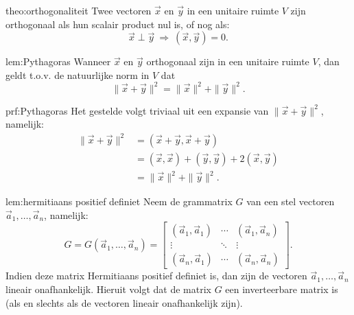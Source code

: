 \begin{theo}[Orthogonaliteit]{theo:orthogonaliteit}
    Twee vectoren $\vec{x}$ en $\vec{y}$ in een unitaire ruimte $V$ zijn orthogonaal als hun scalair product nul is, of nog als:
    \begin{equation*}
        \vec{x} \perp \vec{y} \ \Rightarrow \ (\vec{x},\vec{y}) = 0.
    \end{equation*}
    \vspace{-0.5cm}
\end{theo}

\begin{lem}[Pythagoras]{lem:Pythagoras}
    Wanneer $\vec{x}$ en $\vec{y}$ orthogonaal zijn in een unitaire ruimte $V$, dan geldt t\@.o\@.v\@. de natuurlijke norm in $V$ dat
    \begin{equation*}
        \| \vec{x} + \vec{y} \|^2 = \| \vec{x} \|^2 + \| \vec{y} \|^2.
    \end{equation*}
    \vspace{-0.5cm}
\end{lem}

\begin{prf}[Pythagoras]{prf:Pythagoras}
    Het gestelde volgt triviaal uit een expansie van $\| \vec{x} + \vec{y} \|^2$, namelijk:
    \begin{align*}
        \| \vec{x} + \vec{y} \|^2 
            &= (\vec{x} + \vec{y},\vec{x} + \vec{y}) \\
            &= (\vec{x},\vec{x}) + (\vec{y},\vec{y}) + 2(\vec{x},\vec{y}) \\
            &= \| \vec{x} \|^2 + \| \vec{y} \|^2.
    \end{align*}
    \vspace{-1cm}
\end{prf}

\begin{lem}{lem:hermitiaans positief definiet}
    Neem de grammatrix $G$ van een stel vectoren $\vec{a}_1,\ldots,\vec{a}_n$, namelijk:
    \begin{equation*}
        G = G(\vec{a}_1,\ldots,\vec{a}_n) = 
        \begin{bmatrix}
            (\vec{a}_1,\vec{a}_1) & \cdots & (\vec{a}_1,\vec{a}_n) \\
            \vdots & \ddots & \vdots \\
            (\vec{a}_n,\vec{a}_1) & \cdots & (\vec{a}_n,\vec{a}_n)
        \end{bmatrix}.
    \end{equation*}
    Indien deze matrix Hermitiaans positief definiet is, dan zijn de vectoren $\vec{a}_1,\ldots,\vec{a}_n$ lineair onafhankelijk. Hieruit volgt dat de matrix $G$ een inverteerbare matrix is (als en slechts als de vectoren lineair onafhankelijk zijn).
\end{lem}

